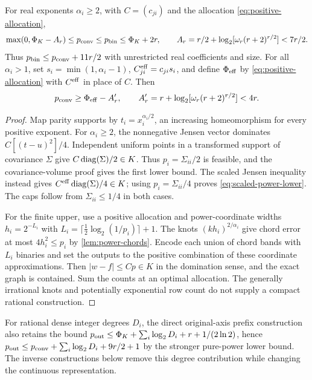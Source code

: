 \begin{proposition}\label{prop:pure-power-finite}
For real exponents $\alpha_i\ge2$, with $C=(c_{ji})$ and the
allocation \eqref{eq:positive-allocation},
\begin{equation}\label{eq:pure-power-finite}
 \max(0,\Phi_K-A_r)\le p_{\mathrm{conv}}\le p_{\mathrm{bin}}\le\Phi_K+2r,
 \qquad A_r=r/2+\log_2[\omega_r(r+2)^{r/2}]<7r/2.
\end{equation}
Thus $p_{\mathrm{bin}}\le p_{\mathrm{conv}}+11r/2$ with unrestricted real coefficients
and size. For all $\alpha_i>1$, set $s_i=\min(1,\alpha_i-1)$,
$C^{\rm eff}_{ji}=c_{ji}s_i$, and define $\Phi_{\rm eff}$ by
\eqref{eq:positive-allocation} with $C^{\rm eff}$ in place of $C$.
Then
\begin{equation}\label{eq:scaled-power-lower}
 p_{\mathrm{conv}}\ge\Phi_{\rm eff}-A_r',
 \qquad A_r'=r+\log_2[\omega_r(r+2)^{r/2}]<4r.
\end{equation}
\end{proposition}
\begin{proof}
Map parity supports by $t_i=x_i^{\alpha_i/2}$, an increasing
homeomorphism for every positive exponent. For $\alpha_i\ge2$, the
nonnegative Jensen vector dominates $C[(t-u)^2]/4$. Independent
uniform points in a transformed support of covariance $\Sigma$ give
$C\operatorname{diag}(\Sigma)/2\in K$. Thus $p_i=\Sigma_{ii}/2$ is feasible,
and the covariance-volume proof gives the first lower bound. The
scaled Jensen inequality instead gives
$C^{\rm eff}\operatorname{diag}(\Sigma)/4\in K$; using
$p_i=\Sigma_{ii}/4$ proves \eqref{eq:scaled-power-lower}.
The caps follow from $\Sigma_{ii}\le1/4$ in both cases.

For the finite upper, use a positive allocation and power-coordinate
widths $h_i=2^{-L_i}$ with
$L_i=\lceil\frac12\log_2(1/p_i)\rceil+1$.
The knots $(kh_i)^{2/\alpha_i}$ give chord error at most
$4h_i^2\le p_i$ by \cref{lem:power-chords}. Encode each union of
chord bands with $L_i$ binaries and set the outputs to the positive
combination of these coordinate approximations. Then
$|w-f|\le Cp\in K$ in the domination sense, and the exact graph is
contained. Sum the counts at an optimal allocation. The generally
irrational knots and potentially exponential row count do not supply
a compact rational construction.
\end{proof}

For rational dense integer degrees $D_i$, the direct original-axis
prefix construction also retains the bound
$p_{\mathrm{out}}\le\Phi_K+\sum_i\log_2D_i+r+1/(2\ln2)$, hence
$p_{\mathrm{out}}\le p_{\mathrm{conv}}+\sum_i\log_2D_i+9r/2+1$ by the stronger
pure-power lower bound. The inverse constructions below remove this
degree contribution while changing the continuous representation.

